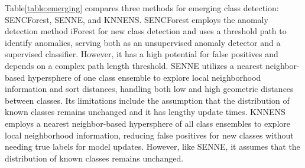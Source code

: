         Table\ref{table:emerging} compares three methods for emerging class detection: SENCForest, SENNE, and KNNENS. SENCForest employs the anomaly detection method iForest \cite{wang2010negative}  for new class detection and uses a threshold path to identify anomalies, serving both as an unsupervised anomaly detector and a supervised classifier. However, it has a high potential for false positives and depends on a complex path length threshold. SENNE utilizes a nearest neighbor-based hypersphere of one class ensemble to explore local neighborhood information and sort distances, handling both low and high geometric distances between classes. Its limitations include the assumption that the distribution of known classes remains unchanged and it has lengthy update times. KNNENS employs a nearest neighbor-based hypersphere of all class ensembles to explore local neighborhood information, reducing false positives for new classes without needing true labels for model updates. However, like SENNE, it assumes that the distribution of known classes remains unchanged.

